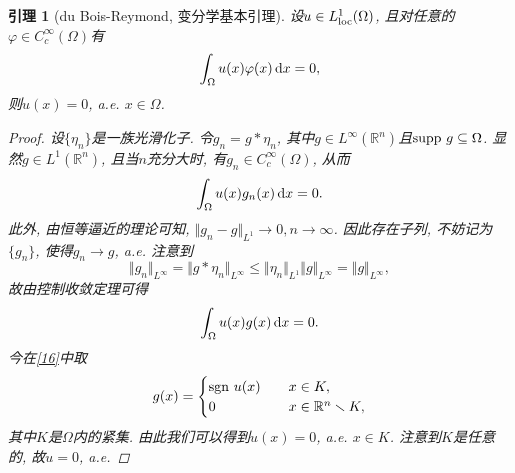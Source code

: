 \documentclass[12pt,a4paper]{article}
\newtheorem{lemma}[theorem]{引理}
\begin{document}
\begin{lemma}[du Bois-Reymond, 变分学基本引理]
    设$u \in L^1_{{\rm loc}}(\Omega)$, 且对任意的$\varphi \in C_c^{\infty}(\Omega)$有 
    \begin{equation*}
        \int_{\Omega}u(x)\varphi(x) \,{\rm d}x = 0,
    \end{equation*}
    则$u(x) = 0$, a.e. $x \in \Omega$.
    \begin{proof}
        设$\{\eta_n\}$是一族光滑化子. 令$g_n = g \ast \eta_n$, 其中$g \in L^{\infty}(\mathbb{R}^n)$且${\rm supp} \ g \subseteq \Omega$.
        显然$g \in L^1(\mathbb{R}^n)$, 且当$n$充分大时, 有$g_n \in C_c^{\infty}(\Omega)$, 从而
        \begin{equation*}
            \int_{\Omega}u(x)g_n(x) \,{\rm d}x = 0.
        \end{equation*}
        此外, 由恒等逼近的理论可知, $\Vert g_n - g \Vert_{L^1} \rightarrow 0, n \rightarrow \infty$.
        因此存在子列, 不妨记为$\{g_n\}$, 使得$g_n \rightarrow g$, a.e. 注意到 
        \begin{equation*}
            \Vert g_n\Vert_{L^{\infty}} = \Vert g \ast \eta_n \Vert_{L^{\infty}} \leq \Vert \eta_n \Vert_{L^1}\Vert g \Vert_{L^{\infty}} = \Vert g \Vert_{L^{\infty}},
        \end{equation*}
        故由控制收敛定理可得 
        \begin{equation}\label{16}
            \int_{\Omega}u(x)g(x) \,{\rm d}x = 0.
        \end{equation}
        今在\eqref{16}中取 
        \begin{equation*}
            g(x) =  
            \begin{cases} 
                {\rm sgn}\ u(x) \quad &x \in K, \\   
                0 \quad &x \in \mathbb{R}^n \smallsetminus K,  
            \end{cases}
        \end{equation*}
        其中$K$是$\Omega$内的紧集. 由此我们可以得到$u(x) = 0$, a.e. $x \in K$.
        注意到$K$是任意的, 故$u = 0$, a.e.
    \end{proof}
\end{lemma}
\end{document}
